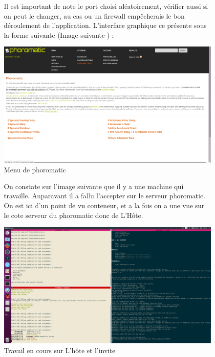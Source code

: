 \documentclass[french]{article}
\begin{document}
\begin{figure}[!h]
Il est important de note le port choisi aléatoirement, vérifier aussi si on peut le changer, au cas ou un firewall empêcherais le bon déroulement de l'application.
L'interface graphique ce présente sous la forme suivante (Image suivante ) : 
\caption{\label{Menu de phoromatic} Menu de phoromatic}
\includegraphics[scale=0.35]{images/menu_phoro.png}
\end{figure} 
\newpage
\begin{figure}[!h]
On constate sur l'image suivante que il y a une machine qui travaille. Auparavant il a fallu l'accepter sur le serveur phoromatic. On est ici d'un point de vu conteneur, et a la fois on a une vue sur le cote serveur du phoromatic donc de L’Hôte.
\caption{\label{ Travail en cours sur L’hôte et l'invite} Travail en cours sur L’hôte et l'invite}
\includegraphics[scale=0.35]{images/capture_phoromatic.png}
\end{figure}
\newpage
\end{document}
